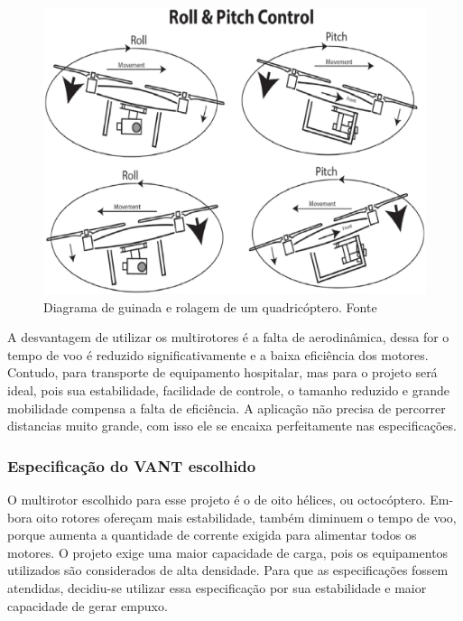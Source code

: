 \begin{figure}[H]
    \centering
      \includegraphics[keepaspectratio=true,scale=0.5]{figuras/guinada.eps}
    \caption{Diagrama de guinada e rolagem de um quadricóptero. Fonte \cite{audronis}}
    \label{fig:guinada}
\end{figure}

A desvantagem de utilizar  os multirotores  é a  falta  de aerodinâmica,  dessa for o tempo de voo é reduzido significativamente e a baixa  eficiência dos motores.  Contudo, para transporte de equipamento hospitalar, mas para o projeto será ideal, pois sua estabilidade, facilidade de controle, o tamanho reduzido e grande mobilidade compensa a falta de eficiência. A aplicação não precisa de percorrer distancias muito grande, com isso ele se encaixa perfeitamente nas especificações.

\subsubsection{Especificação do VANT escolhido}

O multirotor escolhido para esse projeto é o de oito hélices, ou octocóptero. Em- bora oito rotores ofereçam mais estabilidade, também diminuem o tempo de voo, porque aumenta a quantidade de corrente exigida para alimentar todos os motores.  O projeto exige uma maior capacidade de carga, pois os equipamentos utilizados são considerados de alta densidade. Para que as especificações fossem atendidas, decidiu-se utilizar essa especificação por sua estabilidade e maior capacidade de gerar empuxo.

